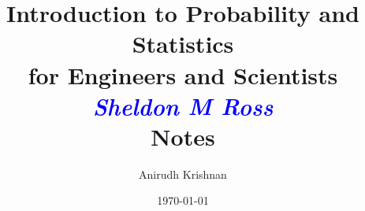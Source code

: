 \documentclass[letterpaper,12pt]{report}
\begin{document}
\author{Anirudh Krishnan}
\title{Introduction to Probability and Statistics \\ for Engineers and Scientists \\ \textit{\textcolor{blue}{Sheldon M Ross}} \\ Notes}
\date{\today}

\maketitle
\tableofcontents

% 
% 
% 
% 
% 
% 
% 
% 
% 
% 
% 
% 
% 
% 
\end{document}
